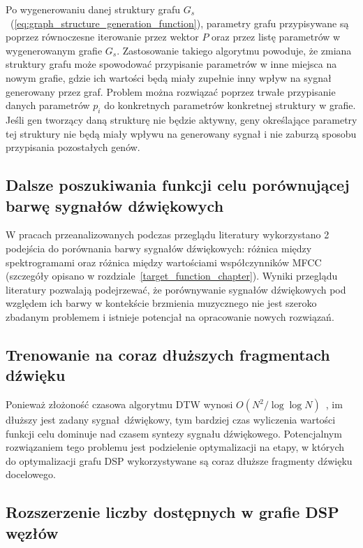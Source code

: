 Po wygenerowaniu danej struktury grafu $G_s$~(\ref{eq:graph_structure_generation_function}),
parametry grafu przypisywane są poprzez równoczesne iterowanie przez wektor $P$ oraz
przez listę parametrów w wygenerowanym grafie $G_s$. Zastosowanie takiego algorytmu
powoduje, że zmiana struktury grafu może spowodować przypisanie parametrów w inne miejsca
na nowym grafie, gdzie ich wartości będą miały zupełnie inny wpływ na sygnał
generowany przez graf. Problem można rozwiązać poprzez trwałe przypisanie danych
parametrów $p_i$ do konkretnych parametrów konkretnej struktury w grafie. Jeśli gen 
tworzący daną strukturę nie będzie aktywny, geny określające parametry tej struktury nie będą
miały wpływu na generowany sygnał i nie zaburzą sposobu przypisania pozostałych genów.


\subsection{Dalsze poszukiwania funkcji celu porównującej barwę sygnałów dźwiękowych}

W pracach przeanalizowanych podczas przeglądu literatury wykorzystano 2 podejścia
do porównania barwy sygnałów dźwiękowych: różnica między spektrogramami oraz
różnica między wartościami współczynników MFCC
(szczegóły opisano w rozdziale~\ref{target_function_chapter}).
Wyniki przeglądu literatury pozwalają podejrzewać, że porównywanie sygnałów
dźwiękowych pod względem ich barwy w kontekście brzmienia muzycznego
nie jest szeroko zbadanym problemem i istnieje potencjał na opracowanie
nowych rozwiązań.


\subsection{Trenowanie na coraz dłuższych fragmentach dźwięku}

Ponieważ złożoność czasowa algorytmu DTW wynosi $O(N^2/\log\log N)$~\cite{dtw_time_complexity},
im dłuższy jest zadany sygnał dźwiękowy, tym bardziej czas wyliczenia
wartości funkcji celu dominuje nad czasem syntezy sygnału dźwiękowego. Potencjalnym
rozwiązaniem tego problemu jest podzielenie optymalizacji na etapy, w których
do optymalizacji grafu DSP wykorzystywane są coraz dłuższe fragmenty dźwięku docelowego.

\subsection{Rozszerzenie liczby dostępnych w grafie DSP węzłów}

